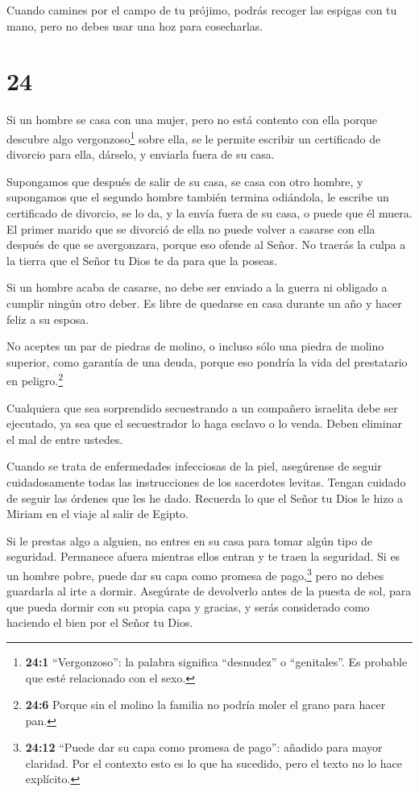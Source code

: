  Cuando camines por el campo de tu prójimo, podrás recoger
las espigas con tu mano, pero no debes usar una hoz para cosecharlas.

\hypertarget{section-23}{%
\section{24}\label{section-23}}

 Si un hombre se casa con una mujer, pero no está contento
con ella porque descubre algo vergonzoso\footnote{\textbf{24:1}
  ``Vergonzoso'': la palabra significa ``desnudez'' o ``genitales''. Es
  probable que esté relacionado con el sexo.} sobre ella, se le permite
escribir un certificado de divorcio para ella, dárselo, y enviarla fuera
de su casa.

 Supongamos que después de salir de su casa, se casa con
otro hombre,  y supongamos que el segundo hombre también
termina odiándola, le escribe un certificado de divorcio, se lo da, y la
envía fuera de su casa, o puede que él muera.  El primer
marido que se divorció de ella no puede volver a casarse con ella
después de que se avergonzara, porque eso ofende al Señor. No traerás la
culpa a la tierra que el Señor tu Dios te da para que la poseas.

 Si un hombre acaba de casarse, no debe ser enviado a la
guerra ni obligado a cumplir ningún otro deber. Es libre de quedarse en
casa durante un año y hacer feliz a su esposa.

 No aceptes un par de piedras de molino, o incluso sólo una
piedra de molino superior, como garantía de una deuda, porque eso
pondría la vida del prestatario en peligro.\footnote{\textbf{24:6}
  Porque sin el molino la familia no podría moler el grano para hacer
  pan.}

 Cualquiera que sea sorprendido secuestrando a un compañero
israelita debe ser ejecutado, ya sea que el secuestrador lo haga esclavo
o lo venda. Deben eliminar el mal de entre ustedes.

 Cuando se trata de enfermedades infecciosas de la piel,
asegúrense de seguir cuidadosamente todas las instrucciones de los
sacerdotes levitas. Tengan cuidado de seguir las órdenes que les he
dado.  Recuerda lo que el Señor tu Dios le hizo a Miriam en
el viaje al salir de Egipto.

 Si le prestas algo a alguien, no entres en su casa para
tomar algún tipo de seguridad.  Permanece afuera mientras
ellos entran y te traen la seguridad.  Si es un hombre
pobre, puede dar su capa como promesa de pago,\footnote{\textbf{24:12}
  ``Puede dar su capa como promesa de pago'': añadido para mayor
  claridad. Por el contexto esto es lo que ha sucedido, pero el texto no
  lo hace explícito.} pero no debes guardarla al irte a dormir.
 Asegúrate de devolverlo antes de la puesta de sol, para
que pueda dormir con su propia capa y gracias, y serás considerado como
haciendo el bien por el Señor tu Dios.

